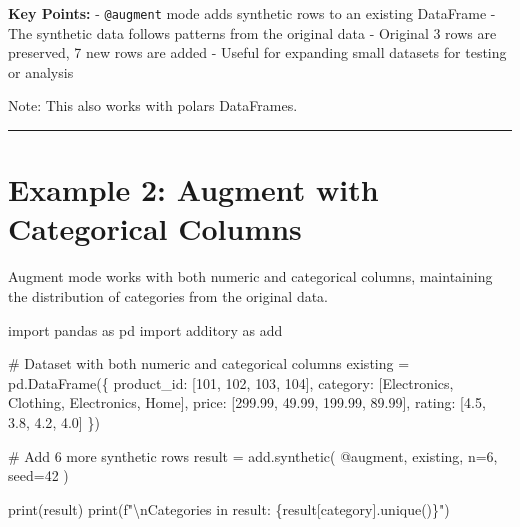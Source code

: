 \documentclass[
  letterpaper,
]{scrbook}
\newenvironment{Shaded}{\begin{snugshade}}{\end{snugshade}}
\newcommand{\BuiltInTok}[1]{\textcolor[rgb]{0.00,0.23,0.31}{#1}}
\newcommand{\CharTok}[1]{\textcolor[rgb]{0.13,0.47,0.30}{#1}}
\newcommand{\CommentTok}[1]{\textcolor[rgb]{0.37,0.37,0.37}{#1}}
\newcommand{\DecValTok}[1]{\textcolor[rgb]{0.68,0.00,0.00}{#1}}
\newcommand{\FloatTok}[1]{\textcolor[rgb]{0.68,0.00,0.00}{#1}}
\newcommand{\ImportTok}[1]{\textcolor[rgb]{0.00,0.46,0.62}{#1}}
\newcommand{\NormalTok}[1]{\textcolor[rgb]{0.00,0.23,0.31}{#1}}
\newcommand{\OperatorTok}[1]{\textcolor[rgb]{0.37,0.37,0.37}{#1}}
\newcommand{\SpecialCharTok}[1]{\textcolor[rgb]{0.37,0.37,0.37}{#1}}
\newcommand{\SpecialStringTok}[1]{\textcolor[rgb]{0.13,0.47,0.30}{#1}}
\newcommand{\StringTok}[1]{\textcolor[rgb]{0.13,0.47,0.30}{#1}}
\begin{document}
\textbf{Key Points:} - \texttt{@augment} mode adds synthetic rows to an
existing DataFrame - The synthetic data follows patterns from the
original data - Original 3 rows are preserved, 7 new rows are added -
Useful for expanding small datasets for testing or analysis

Note: This also works with polars DataFrames.

\begin{center}\rule{0.5\linewidth}{0.5pt}\end{center}

\section{Example 2: Augment with Categorical
Columns}\label{example-2-augment-with-categorical-columns}

Augment mode works with both numeric and categorical columns,
maintaining the distribution of categories from the original data.

\begin{Shaded}
\begin{Highlighting}[]
\ImportTok{import}\NormalTok{ pandas }\ImportTok{as}\NormalTok{ pd}
\ImportTok{import}\NormalTok{ additory }\ImportTok{as}\NormalTok{ add}

\CommentTok{\# Dataset with both numeric and categorical columns}
\NormalTok{existing }\OperatorTok{=}\NormalTok{ pd.DataFrame(\{}
    \StringTok{\textquotesingle{}product\_id\textquotesingle{}}\NormalTok{: [}\DecValTok{101}\NormalTok{, }\DecValTok{102}\NormalTok{, }\DecValTok{103}\NormalTok{, }\DecValTok{104}\NormalTok{],}
    \StringTok{\textquotesingle{}category\textquotesingle{}}\NormalTok{: [}\StringTok{\textquotesingle{}Electronics\textquotesingle{}}\NormalTok{, }\StringTok{\textquotesingle{}Clothing\textquotesingle{}}\NormalTok{, }\StringTok{\textquotesingle{}Electronics\textquotesingle{}}\NormalTok{, }\StringTok{\textquotesingle{}Home\textquotesingle{}}\NormalTok{],}
    \StringTok{\textquotesingle{}price\textquotesingle{}}\NormalTok{: [}\FloatTok{299.99}\NormalTok{, }\FloatTok{49.99}\NormalTok{, }\FloatTok{199.99}\NormalTok{, }\FloatTok{89.99}\NormalTok{],}
    \StringTok{\textquotesingle{}rating\textquotesingle{}}\NormalTok{: [}\FloatTok{4.5}\NormalTok{, }\FloatTok{3.8}\NormalTok{, }\FloatTok{4.2}\NormalTok{, }\FloatTok{4.0}\NormalTok{]}
\NormalTok{\})}

\CommentTok{\# Add 6 more synthetic rows}
\NormalTok{result }\OperatorTok{=}\NormalTok{ add.synthetic(}
    \StringTok{\textquotesingle{}@augment\textquotesingle{}}\NormalTok{,}
\NormalTok{    existing,}
\NormalTok{    n}\OperatorTok{=}\DecValTok{6}\NormalTok{,}
\NormalTok{    seed}\OperatorTok{=}\DecValTok{42}
\NormalTok{)}

\BuiltInTok{print}\NormalTok{(result)}
\BuiltInTok{print}\NormalTok{(}\SpecialStringTok{f"}\CharTok{\textbackslash{}n}\SpecialStringTok{Categories in result: }\SpecialCharTok{\{}\NormalTok{result[}\StringTok{\textquotesingle{}category\textquotesingle{}}\NormalTok{]}\SpecialCharTok{.}\NormalTok{unique()}\SpecialCharTok{\}}\SpecialStringTok{"}\NormalTok{)}
\end{Highlighting}
\end{Shaded}
\end{document}
